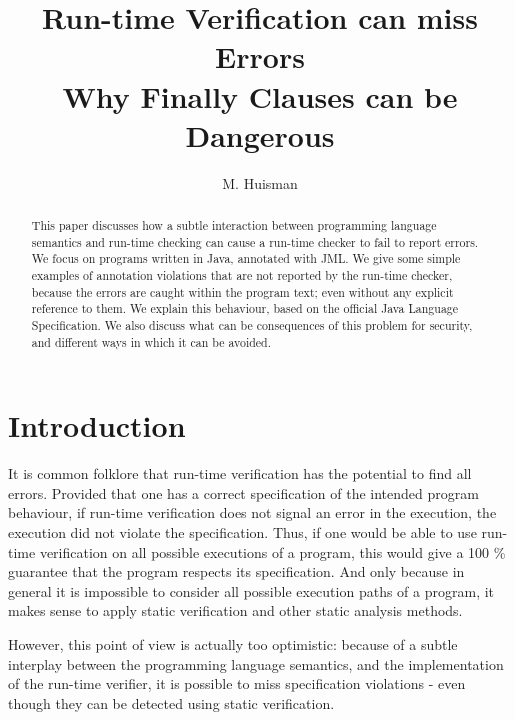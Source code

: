 \documentclass[]{llncs}
\title{Run-time Verification can miss Errors\\{\large Why Finally
Clauses can be Dangerous}}
\author{M. Huisman}
\institute{INRIA Sophia Antipolis-Mediterran\'ee, France}
\begin{document}
\maketitle

\begin{abstract}
This paper discusses how a subtle interaction between programming
language semantics and run-time checking can cause a run-time checker
to fail to report errors. We focus on programs written in Java,
annotated with JML. We give some simple examples of annotation
violations that are not reported by the run-time checker, because the
errors are caught within the program text; even without any explicit
reference to them. We explain this behaviour, based on the official
Java Language Specification. We also discuss what can be consequences
of this problem for security, and different ways in which it can be
avoided.

\end{abstract}

\section{Introduction}

It is common folklore that run-time verification has the potential to
find all errors. Provided that one has a correct specification of the
intended program behaviour, if run-time verification does not signal
an error in the execution, the execution did not violate the
specification. Thus, if one would be able to use run-time verification
on all possible executions of a program, this would give a 100 \%
guarantee that the program respects its specification. And only
because in general it is impossible to consider all possible execution
paths of a program, it makes sense to apply static verification and
other static analysis methods.

However, this point of view is actually too optimistic: because of a
subtle interplay between the programming language semantics, and the
implementation of the run-time verifier, it is possible to miss
specification violations - even though they can be detected using
static verification.
\end{document}
